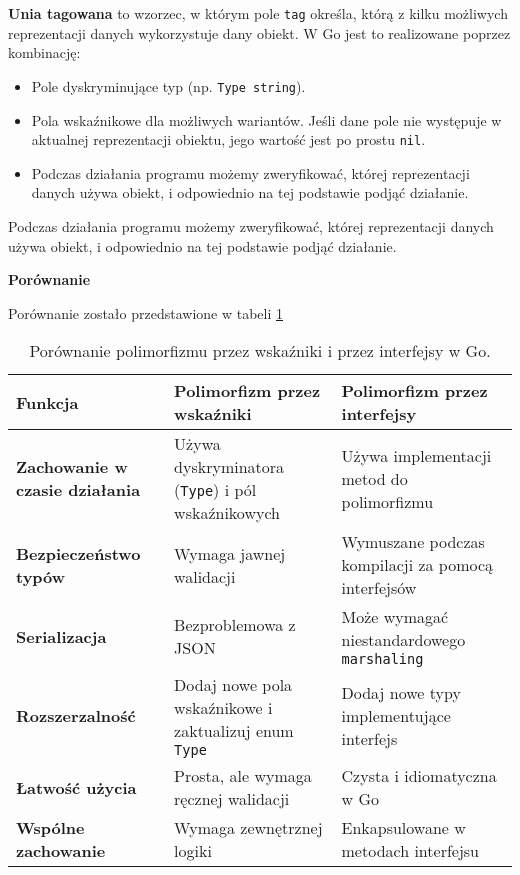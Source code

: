 \textbf{Unia tagowana} to wzorzec, w którym pole \texttt{tag} określa, którą z kilku możliwych reprezentacji danych wykorzystuje dany obiekt. W Go jest to realizowane poprzez kombinację:

\begin{itemize}
    \item Pole dyskryminujące typ (np. \texttt{Type string}).
    \item Pola wskaźnikowe dla możliwych wariantów. Jeśli dane pole nie występuje w aktualnej reprezentacji obiektu, jego wartość jest po prostu \texttt{nil}.
    \item Podczas działania programu możemy zweryfikować, której reprezentacji danych używa obiekt, i odpowiednio na tej podstawie podjąć działanie.
\end{itemize}

Podczas działania programu możemy zweryfikować, której reprezentacji danych używa obiekt, i odpowiednio na tej podstawie podjąć działanie.

\textbf{Porównanie}

Porównanie zostało przedstawione w tabeli \ref{tab:431}

\begin{table}[h!]
\centering
\renewcommand{\arraystretch}{1.5} %
\begin{tabular}{|p{4cm}|p{5.5cm}|p{5.5cm}|}
\hline
\textbf{Funkcja}               & \textbf{Polimorfizm przez wskaźniki}                                   & \textbf{Polimorfizm przez interfejsy}                          \\ \hline
\textbf{Zachowanie w czasie działania} & Używa dyskryminatora (\texttt{Type}) i pól wskaźnikowych           & Używa implementacji metod do polimorfizmu                     \\ \hline
\textbf{Bezpieczeństwo typów}      & Wymaga jawnej walidacji                                              & Wymuszane podczas kompilacji za pomocą interfejsów            \\ \hline
\textbf{Serializacja}          & Bezproblemowa z JSON                                                 & Może wymagać niestandardowego \texttt{marshaling}             \\ \hline
\textbf{Rozszerzalność}        & Dodaj nowe pola wskaźnikowe i zaktualizuj enum \texttt{Type}          & Dodaj nowe typy implementujące interfejs                      \\ \hline
\textbf{Łatwość użycia}         & Prosta, ale wymaga ręcznej walidacji                                 & Czysta i idiomatyczna w Go                                    \\ \hline
\textbf{Wspólne zachowanie}    & Wymaga zewnętrznej logiki                                            & Enkapsulowane w metodach interfejsu                           \\ \hline
\end{tabular}
\caption{Porównanie polimorfizmu przez wskaźniki i przez interfejsy w Go.}\label{tab:431}
\end{table}

